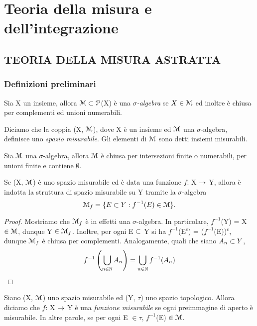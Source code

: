 \documentclass[Completo.tex]{subfiles}
\begin{document}
	\chapter{Teoria della misura e dell'integrazione}
	\section{TEORIA DELLA MISURA ASTRATTA}
	\subsection{Definizioni preliminari}
	\begin{Def}
	Sia X un insieme, allora $\eu[M] \sset \eu[P]$(X) è una \textit{$\sigma$-algebra} se $X \in \eu[M]$ ed inoltre è chiusa per complementi ed unioni numerabili.
\end{Def}
\begin{Def}
	Diciamo che la coppia (X, $\eu[M]$), dove X è un insieme ed $\eu[M]$ una $\sigma$-algebra, definisce uno \textit{spazio misurabile}. Gli elementi di $\eu[M]$ sono detti insiemi misurabili.
\end{Def}
\begin{Prop}
	Sia $\eu[M]$ una $\sigma$-algebra, allora $\eu[M]$ è chiusa per intersezioni finite o numerabili, per unioni finite e contiene $\emptyset$.
\end{Prop}
\begin{eTh}
	Se (X, $\eu[M]$) è uno spazio misurabile ed è data una funzione $f$: X $\rightarrow$ Y, allora è indotta la struttura di spazio misurabile su Y tramite la $\sigma$-algebra
	\begin{equation*}
	\eu[M]_f = \{E \sset Y: f^{-1}(E) \in \eu[M]\}.
	\end{equation*}
\end{eTh}
\begin{proof}
	Mostriamo che $\eu[M]_f$ è in effetti una $\sigma$-algebra. In particolare, $f^{-1}$(Y) = X $\in \eu[M]$, dunque Y $\in \eu[M]_f$. Inoltre, per ogni E $\subset$ Y si ha $f^{-1}$(E$^{c}$) = ($f^{-1}$(E))$^{c}$, dunque $\eu[M]_f$ è chiusa per complementi. Analogamente, quali che siano $A_n \subset Y$,
	\begin{equation*}
	f^{-1}\left(\bigcup\limits_{n \in \bb[N]}A_n\right) = \bigcup\limits_{n \in \bb[N]} f^{-1}(A_n)
	\end{equation*}
\end{proof}
\begin{Def}
	Siano (X, $\eu[M]$) uno spazio misurabile ed (Y, $\tau$) uno spazio topologico. Allora diciamo che $f$: X $\rightarrow$ Y è una \textit{funzione misurabile} se ogni preimmagine di aperto è misurabile. In altre parole, se per ogni E $\in \tau$, $f^{-1}$(E) $\in \eu[M]$.
\end{Def}
\end{document}
